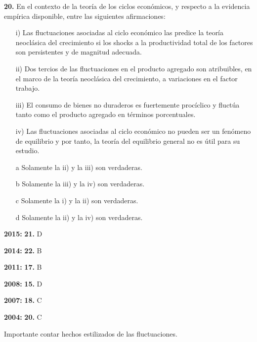 \documentclass{nuevotema}
\begin{document}

\textbf{20.} En el contexto de la teoría de los ciclos económicos, y respecto a la evidencia empírica disponible, entre las siguientes afirmaciones:

\begin{itemize}
	\item[i)] Las fluctuaciones asociadas al ciclo económico las predice la teoría neoclásica del crecimiento si los shocks a la productividad total de los factores son persistentes y de magnitud adecuada.
	\item[ii)] Dos tercios de las fluctuaciones en el producto agregado son atribuibles, en el marco de la teoría neoclásica del crecimiento, a variaciones en el factor trabajo.
	\item[iii)] El consumo de bienes no duraderos es fuertemente procíclico y fluctúa tanto como el producto agregado en términos porcentuales.
	\item[iv)] Las fluctuaciones asociadas al ciclo económico no pueden ser un fenómeno de equilibrio y por tanto, la teoría del equilibrio general no es útil para su estudio.
\end{itemize}

\begin{itemize}
	\item[a] Solamente la ii) y la iii) son verdaderas.
	\item[b] Solamente la iii) y la iv) son verdaderas.
	\item[c] Solamente la i) y la ii) son verdaderas.
	\item[d] Solamente la ii) y la iv) son verdaderas.
\end{itemize}

\notas

\textbf{2015:} \textbf{21.} D

\textbf{2014:} \textbf{22.} B

\textbf{2011:} \textbf{17.} B

\textbf{2008:} \textbf{15.} D

\textbf{2007:} \textbf{18.} C

\textbf{2004:} \textbf{20.} C


Importante contar hechos estilizados de las fluctuaciones.

\bibliografia
\end{document}
